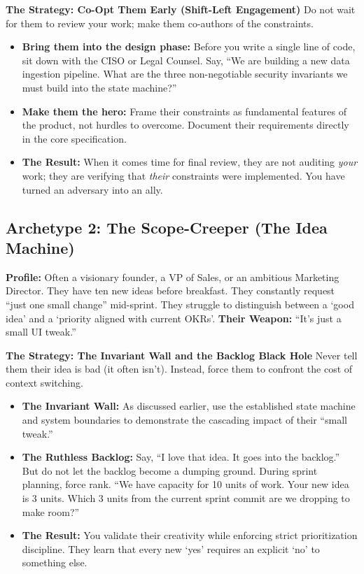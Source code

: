 \documentclass[
  11pt,
  openany,
  oneside]{book}
\providecommand{\tightlist}{%
  \setlength{\itemsep}{0pt}\setlength{\parskip}{0pt}}
\begin{document}
\textbf{The Strategy: Co-Opt Them Early (Shift-Left Engagement)} Do not
wait for them to review your work; make them co-authors of the
constraints.

\begin{itemize}
\tightlist
\item
  \textbf{Bring them into the design phase:} Before you write a single
  line of code, sit down with the CISO or Legal Counsel. Say, ``We are
  building a new data ingestion pipeline. What are the three
  non-negotiable security invariants we must build into the state
  machine?''
\item
  \textbf{Make them the hero:} Frame their constraints as fundamental
  features of the product, not hurdles to overcome. Document their
  requirements directly in the core specification.
\item
  \textbf{The Result:} When it comes time for final review, they are not
  auditing \emph{your} work; they are verifying that \emph{their}
  constraints were implemented. You have turned an adversary into an
  ally.
\end{itemize}

\subsection{Archetype 2: The Scope-Creeper (The Idea
Machine)}\label{archetype-2-the-scope-creeper-the-idea-machine}

\textbf{Profile:} Often a visionary founder, a VP of Sales, or an
ambitious Marketing Director. They have ten new ideas before breakfast.
They constantly request ``just one small change'' mid-sprint. They
struggle to distinguish between a `good idea' and a `priority aligned
with current OKRs'. \textbf{Their Weapon:} ``It's just a small UI
tweak.''

\textbf{The Strategy: The Invariant Wall and the Backlog Black Hole}
Never tell them their idea is bad (it often isn't). Instead, force them
to confront the cost of context switching.

\begin{itemize}
\tightlist
\item
  \textbf{The Invariant Wall:} As discussed earlier, use the established
  state machine and system boundaries to demonstrate the cascading
  impact of their ``small tweak.''
\item
  \textbf{The Ruthless Backlog:} Say, ``I love that idea. It goes into
  the backlog.'' But do not let the backlog become a dumping ground.
  During sprint planning, force rank. ``We have capacity for 10 units of
  work. Your new idea is 3 units. Which 3 units from the current sprint
  commit are we dropping to make room?''
\item
  \textbf{The Result:} You validate their creativity while enforcing
  strict prioritization discipline. They learn that every new `yes'
  requires an explicit `no' to something else.
\end{itemize}
\end{document}
